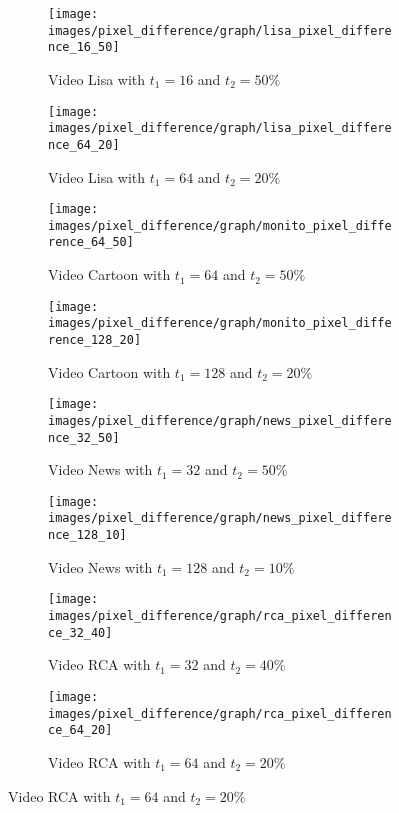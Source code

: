 \documentclass[journal]{IEEEtran}
\begin{document}
\begin{figure}
	\centering
	\begin{subfigure}{0.23\textwidth}
		\centering
		\texttt{[image: images/pixel\_difference/graph/lisa\_pixel\_difference\_16\_50]} 
		\caption{Video Lisa with $t_1 = 16$ and $t_2 = 50\%$}
		\label{fig:pixel_difference:graph:lisa_16_50} 
	\end{subfigure}
	\centering
	\begin{subfigure}{0.23\textwidth}
		\centering
		\texttt{[image: images/pixel\_difference/graph/lisa\_pixel\_difference\_64\_20]}
		\caption{Video Lisa with $t_1 = 64$ and $t_2 = 20\%$}
		\label{fig:pixel_difference:graph:lisa_64_20}
	\end{subfigure}
	
	\centering
	\begin{subfigure}{0.23\textwidth}
		\centering
		\texttt{[image: images/pixel\_difference/graph/monito\_pixel\_difference\_64\_50]} 
		\caption{Video Cartoon with $t_1 = 64$ and $t_2 = 50\%$}
		\label{fig:pixel_difference:graph:cartoon_64_50} 
	\end{subfigure}
	\centering
	\begin{subfigure}{0.23\textwidth}
		\centering
		\texttt{[image: images/pixel\_difference/graph/monito\_pixel\_difference\_128\_20]}
		\caption{Video Cartoon with $t_1 = 128$ and $t_2 = 20\%$}
		\label{fig:pixel_difference:graph:cartoon_128_20}
	\end{subfigure}
	
	\centering
	\begin{subfigure}{0.23\textwidth}
		\centering
		\texttt{[image: images/pixel\_difference/graph/news\_pixel\_difference\_32\_50]} 
		\caption{Video News with $t_1 = 32$ and $t_2 = 50\%$}
		\label{fig:pixel_difference:graph:news_32_50} 
	\end{subfigure}
	\centering
	\begin{subfigure}{0.23\textwidth}
		\centering
		\texttt{[image: images/pixel\_difference/graph/news\_pixel\_difference\_128\_10]}
		\caption{Video News with $t_1 = 128$ and $t_2 = 10\%$}
		\label{fig:pixel_difference:graph:news_128_10}
	\end{subfigure}
	
	\centering
	\begin{subfigure}{0.23\textwidth}
		\centering
		\texttt{[image: images/pixel\_difference/graph/rca\_pixel\_difference\_32\_40]} 
		\caption{Video RCA with $t_1 = 32$ and $t_2 = 40\%$}
		\label{fig:pixel_difference:graph:rca_32_40} 
	\end{subfigure}
	\centering
	\begin{subfigure}{0.23\textwidth}
		\centering
		\texttt{[image: images/pixel\_difference/graph/rca\_pixel\_difference\_64\_20]}
		\caption{Video RCA with $t_1 = 64$ and $t_2 = 20\%$}
		\label{fig:pixel_difference:graph:rca_64_20}
	\end{subfigure}
	

\end{figure}
\end{document}
